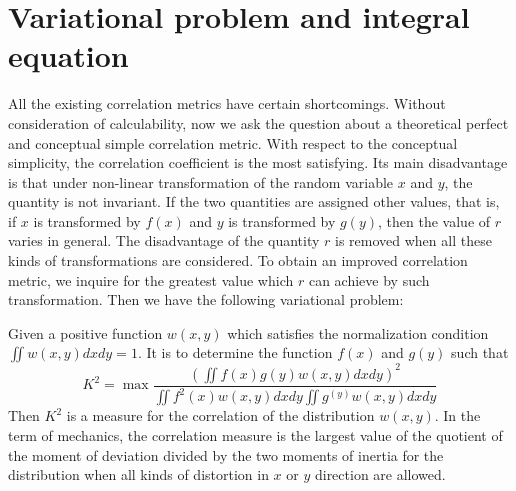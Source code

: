 \documentclass{article}
\begin{document}
\section{Variational problem and integral equation}
All the existing correlation metrics have certain shortcomings. Without consideration of calculability, now we ask the question about a theoretical perfect and conceptual simple correlation metric.
With respect to the conceptual simplicity, the correlation coefficient is the most satisfying.
Its main disadvantage is that under non-linear transformation of the random variable $x$
and $y$, the quantity is not invariant.
If the two quantities are assigned other values,
that is, if $x$ is transformed by $f(x)$ and $y$
is transformed by $g(y)$, then the value of $r$
varies in general. The disadvantage of the quantity $r$
is removed when all these kinds of transformations
are considered. To obtain an improved correlation metric,
we inquire for the greatest value which $r$ can achieve by
such transformation. Then we have the following variational problem:

Given a positive function $w(x,y)$ which satisfies the
normalization condition $\iint w(x,y)dxdy=1$. It is to determine the function $f(x)$ and $g(y)$ such that
\begin{equation}
    K^2 = \max\frac{(\iint f(x)g(y)w(x,y)dxdy)^2}
    {\iint f^2(x)w(x,y)dxdy \iint g^(y) w(x,y)dxdy}
\end{equation}
Then $K^2$ is a measure for the correlation of the distribution
$w(x,y)$. In the term of mechanics,
the correlation measure is the largest value of the quotient
of the moment of deviation divided by the two moments of inertia for the distribution when all kinds of distortion in $x$ or $y$ direction are allowed.
\end{document}
